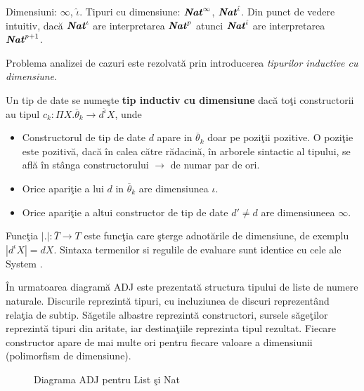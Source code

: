 \begin{example}
Dimensiuni: $\infty$, $\hat{\iota}$. Tipuri cu dimensiune: $\textbf{\emph{Nat}}^\infty$, $\textbf{\emph{Nat}}^{\hat{\iota}}$. Din punct de vedere intuitiv, dac\u a $\textbf{\emph{Nat}}^{\iota}$ are interpretarea $\textbf{\emph{Nat}}^{p}$ atunci $\textbf{\emph{Nat}}^{\hat{\iota}}$ are interpretarea $\textbf{\emph{Nat}}^{p+1}$.
\end{example}
Problema analizei de cazuri este rezolvat\u a prin introducerea \emph{tipurilor inductive cu dimensiune}.
\begin{definition}
Un tip de date se nume\c ste \textbf{tip inductiv cu dimensiune} dac\u a to\c ti constructorii au tipul $c_k : \Pi X. \overline{\theta}_k \to d^{\hat{\iota}} X$, unde
\begin{itemize}\addtolength{\itemsep}{-0.5\baselineskip}
  \item Constructorul de tip de date $d$ apare in $\overline{\theta}_k$ doar pe pozi\c tii pozitive. O pozi\c tie este pozitiv\u a, dac\u a \^ in calea c\u atre r\u adacin\u a, \^ in arborele sintactic al tipului, se afl\u a \^ in st\^ anga constructorului $\to$ de numar par de ori.
  \item Orice apari\c tie a lui $d$ in $\overline{\theta}_k$ are dimensiunea $\iota$.
  \item Orice apari\c tie a altui constructor de tip de date $d' \neq d$ are dimensiuneea $\infty$.
\end{itemize}
\end{definition}\done{}
Func\c tia $|.|:\overline{T} \to T$ este func\c tia care \c sterge adnot\u arile de dimensiune, de exemplu $|d^\iota X| = d X $.
Sintaxa termenilor si regulile de evaluare sunt identice cu cele ale System \frec.
\begin{example}
\^ In urmatoarea diagram\u a ADJ \citep{adj} este prezentat\u a structura tipului de liste de numere naturale. Discurile reprezint\u a tipuri, cu incluziunea de discuri reprezent\^ and rela\c tia de subtip. S\u agetile albastre reprezint\u a constructori, sursele s\u age\c tilor reprezint\u a tipuri din aritate, iar destina\c tiile reprezinta tipul rezultat. Fiecare constructor apare de mai multe ori pentru fiecare valoare a dimensiunii (polimorfism de dimensiune).
\begin{figure}
\begin{center}

\end{center}
\caption{Diagrama ADJ pentru List \c si Nat}
\label{adj_list_nat}
\end{figure}
\end{example}


